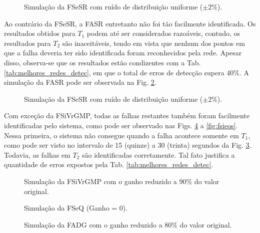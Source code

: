 \begin{figure}[htb]
\footnotesize
\centering

\vspace{1cm}
\caption{Simulação da FSeSR com ruído de distribuição uniforme ($\pm 2\%$).}
\label{fig:fsesr}
\end{figure}

Ao contrário da FSeSR, a FASR entretanto não foi tão facilmente identificada. Os
resultados obtidos para $T_1$ podem até ser considerados razoáveis, contudo, os
resultados para $T_2$ são inaceitáveis, tendo em vista que nenhum dos pontos em
que a falha deveria ter sido identificada foram reconhecidos pela rede. Apesar
disso, observa-se que os resultados estão condizentes com a Tab.
\ref{tab:melhores_redes_detec}, em que o total de erros de detecção supera 40\%.
A simulação da FASR pode ser observada na Fig. \ref{fig:fasr}.

\begin{figure}[htb] \footnotesize \centering 
\vspace{1cm} \caption{Simulação da FSeSR com ruído de distribuição uniforme
($\pm 2\%$).} \label{fig:fasr} \end{figure}

Com exceção da FSiVrGMP, todas as falhas restantes também foram facilmente
identificadas pelo sistema, como pode ser observado nas Figs. \ref{fig:fseq} a
\ref{fig:fsieos}. Nessa primeira, o sistema não consegue quando a falha acontece
somente em $T_1$, como pode ser visto no intervalo de 15 (quinze) a 30 (trinta)
segundos da Fig. \ref{fig:fsivrgmp}. Todavia, as falhas em $T_2$ são
identificadas corretamente. Tal fato justifica a quantidade de erros expostos
pela Tab. \ref{tab:melhores_redes_detec}.

\begin{figure}[htb]
\footnotesize
\centering

\vspace{1cm}
\caption{Simulação da FSiVrGMP com o ganho reduzido a 90\% do valor original.}
\label{fig:fsivrgmp}
\end{figure}

\begin{figure}[htb]
\footnotesize
\centering

\vspace{1cm}
\caption{Simulação da FSeQ (Ganho = 0).}
\label{fig:fseq}
\end{figure}

\begin{figure}[htb]
\footnotesize
\centering

\vspace{1cm}
\caption{Simulação da FADG com o ganho reduzido a 80\% do valor original.}
\label{fig:fadg}
\end{figure}


